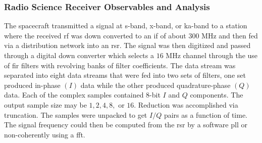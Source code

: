 \documentclass{article}
\begin{document}
            \subsubsection{%
                Radio Science Receiver Observables and Analysis
            }
                The spacecraft transmitted a signal at
                \gls{s-band}, \gls{x-band}, or \gls{ka-band} to
                a station where the received \gls{rf} was down
                converted to an \gls{if} of about $300$ MHz and
                then fed via a \gls{distribution network} into
                an \gls{rsr}. The signal was then digitized and
                passed through a digital down converter which
                selects a $16$ MHz channel through the use of
                \gls{fir} filters with revolving banks of filter
                coefficients. The data stream was separated into
                eight  data streams
                that were fed into two sets of filters, one set
                produced \gls{in-phase} $(I)$ data while the other
                produced \gls{quadrature-phase} $(Q)$ data.
                Each of the complex samples contained 8-bit $I$
                and $Q$ components. The output sample size may be
                $1,2,4,8,$ or $16$. Reduction was accomplished via
                \gls{truncation}. The samples were unpacked to get
                $I/Q$ pairs as a function of time. The signal
                \gls{frequency} could then be computed from the
                \gls{rsr} by a software \gls{pll} or
                non-coherently using a \gls{fft}. 
\end{document}
